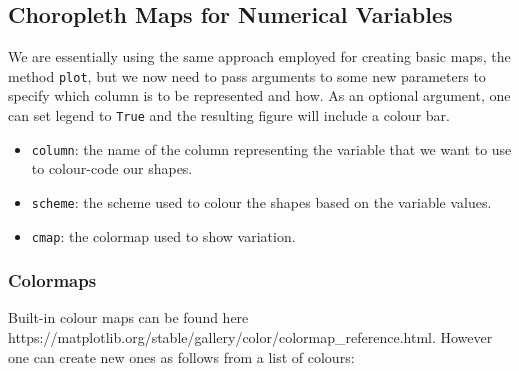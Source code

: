 \documentclass[
  letterpaper,
  DIV=11,
  numbers=noendperiod]{scrreprt}
\providecommand{\tightlist}{%
  \setlength{\itemsep}{0pt}\setlength{\parskip}{0pt}}\usepackage{longtable,booktabs,array}
\begin{document}
\subsection{Choropleth Maps for Numerical
Variables}\label{choropleth-maps-for-numerical-variables}

We are essentially using the same approach employed for creating basic
maps, the method \texttt{plot}, but we now need to pass arguments to
some new parameters to specify which column is to be represented and
how. As an optional argument, one can set legend to \texttt{True} and
the resulting figure will include a colour bar.

\begin{itemize}
\tightlist
\item
  \texttt{column}: the name of the column representing the variable that
  we want to use to colour-code our shapes.
\item
  \texttt{scheme}: the scheme used to colour the shapes based on the
  variable values.
\item
  \texttt{cmap}: the colormap used to show variation.
\end{itemize}

\subsubsection{Colormaps}\label{colormaps}

Built-in colour maps can be found here
https://matplotlib.org/stable/gallery/color/colormap\_reference.html.
However one can create new ones as follows from a list of colours:
\end{document}
